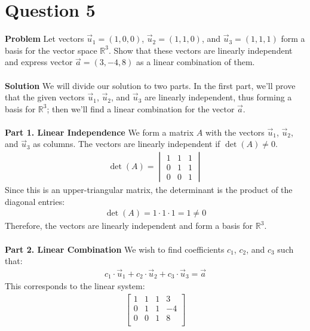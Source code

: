 \documentclass{article}
\begin{document}
\section{Question 5}
\textbf{Problem}
Let vectors $\vec{u}_{1} = (1,0,0)$, $\vec{u}_{2} = (1,1,0)$, and
$\vec{u}_{3} = (1,1,1)$ form a basis for the vector space $\mathbb{R}^{3}$. Show
that these vectors are linearly independent and express vector
$\vec{a} = (3,-4,8)$ as a linear combination of them.
\\
\\
\textbf{Solution}
We will divide our solution to two parts. In the first part, we'll prove that
the given vectors $\vec{u}_{1}$, $\vec{u}_{2}$, and $\vec{u}_{3}$ are linearly
independent, thus forming a basis for $\mathbb{R}^{3}$; then we'll find a linear
combination for the vector $\vec{a}$.
\\
\\
\textbf{Part 1. Linear Independence}
We form a matrix $A$ with the vectors $\vec{u}_{1}$, $\vec{u}_{2}$, and
$\vec{u}_{3}$ as columns. The vectors are linearly independent if
$\det(A) \neq 0$.
\begin{align*}
	\det(A) =
	\begin{vmatrix}
		1 & 1 & 1 \\
		0 & 1 & 1 \\
		0 & 0 & 1
	\end{vmatrix}
\end{align*}
Since this is an upper-triangular matrix, the determinant is the product of the
diagonal entries:
\begin{align*}
	\det(A) = 1 \cdot 1 \cdot 1 = 1 \neq 0
\end{align*}
Therefore, the vectors are linearly independent and form a basis for
$\mathbb{R}^3$.
\\
\\
\textbf{Part 2. Linear Combination}
We wish to find coefficients $c_{1}$, $c_{2}$, and $c_{3}$ such that:
\begin{align*}
	c_{1}\cdot\vec{u}_{1} + c_{2}\cdot\vec{u}_{2} + c_{3}\cdot\vec{u}_{3} = \vec{a}
\end{align*}
This corresponds to the linear system:
\begin{align*}
	\left[
		\begin{array}{ccc|c}
			1 & 1 & 1 & 3  \\
			0 & 1 & 1 & -4 \\
			0 & 0 & 1 & 8  \\
		\end{array}
		\right]
\end{align*}
\end{document}
